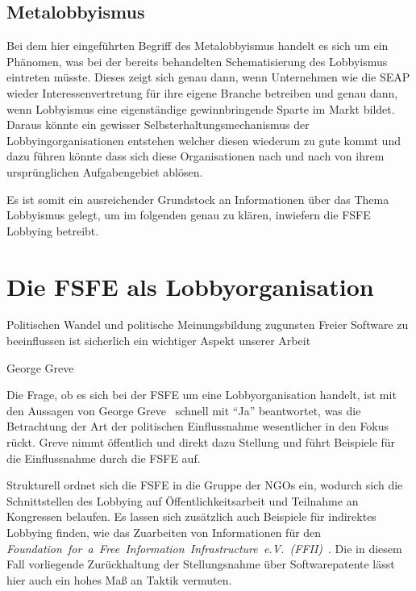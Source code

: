 \subsection{Metalobbyismus}
Bei dem hier eingeführten Begriff des Metalobbyismus handelt es sich um ein 
Phänomen, was bei der bereits behandelten Schematisierung des 
Lobbyismus eintreten müsste. Dieses zeigt sich genau dann, wenn Unternehmen wie 
die SEAP wieder Interessenvertretung für ihre eigene Branche betreiben und 
genau dann, wenn Lobbyismus eine eigenständige gewinnbringende Sparte im Markt 
bildet. Daraus könnte ein gewisser Selbsterhaltungsmechanismus der 
Lobbyingorganisationen entstehen welcher diesen wiederum zu gute kommt und dazu 
führen könnte dass sich diese Organisationen nach und nach von ihrem 
ursprünglichen Aufgabengebiet ablösen.

Es ist somit ein ausreichender Grundstock an Informationen über das Thema 
Lobbyismus gelegt, um im folgenden genau zu klären, inwiefern die FSFE Lobbying 
betreibt.

\newpage
\section{Die FSFE als Lobbyorganisation}
\epigraph{Politischen Wandel und politische Meinungsbildung zugunsten Freier 
Software zu beeinflussen ist sicherlich ein wichtiger Aspekt unserer 
Arbeit}{George Greve~\cite{PLGreveInterView}}
Die Frage, ob es sich bei der FSFE um eine Lobbyorganisation handelt, ist mit 
den 
Aussagen von George Greve~\cite{PLGreveInterView} schnell mit ``Ja'' 
beantwortet, was die Betrachtung der Art der politischen Einflussnahme 
wesentlicher in den Fokus rückt. Greve nimmt öffentlich und direkt 
dazu Stellung und führt Beispiele für die Einflussnahme durch die FSFE auf.

Strukturell ordnet sich die FSFE in die Gruppe der NGOs ein, wodurch sich die 
Schnittstellen des Lobbying auf Öffentlichkeitsarbeit und Teilnahme an 
Kongressen belaufen. Es lassen sich zusätzlich auch Beispiele für indirektes 
Lobbying finden, wie \zB das Zuarbeiten von Informationen für den 
\emph{Foundation~for~a~Free~Information~Infrastructure~e.V.~(FFII)}~\cite{PLGreveInterView}.
Die in diesem Fall vorliegende Zurückhaltung der Stellungsnahme über 
Softwarepatente lässt hier auch ein hohes Maß an Taktik vermuten.

